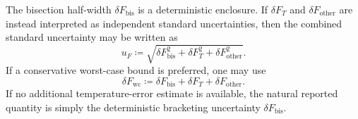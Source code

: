 The bisection half-width \(\delta F_{\mathrm{bis}}\) is a deterministic enclosure.
If \(\delta F_T\) and \(\delta F_{\mathrm{other}}\) are instead interpreted as independent
standard uncertainties, then the combined standard uncertainty may be written as
\begin{equation}
    u_F
    \coloneqq
    \sqrt{
        \delta F_{\mathrm{bis}}^2
        +
        \delta F_T^2
        +
        \delta F_{\mathrm{other}}^2
    }.
    \label{eq:app-combined-uncertainty}
\end{equation}
If a conservative worst-case bound is preferred, one may use
\begin{equation}
    \delta F_{\mathrm{wc}}
    \coloneqq
    \delta F_{\mathrm{bis}}
    +
    \delta F_T
    +
    \delta F_{\mathrm{other}}.
\end{equation}
If no additional temperature-error estimate is available, the natural reported quantity is simply the deterministic bracketing uncertainty \(\delta F_{\mathrm{bis}}\).
